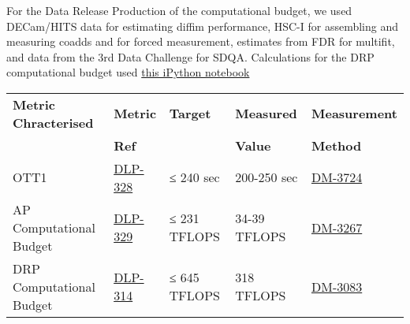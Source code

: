 \documentclass[DM,toc,lsstdraft]{lsstdoc}
\begin{document}
For the Data Release Production of the computational budget, we used
DECam/HITS data for estimating diffim performance, HSC-I for assembling
and measuring coadds and for forced measurement, estimates from FDR for
multifit, and data from the 3rd Data Challenge for SDQA. Calculations
for the DRP computational budget used
\href{https://github.com/lsst-dm/kpm/blob/29c053f7b832e8bd999527e012681826fc0c201c/DLP-314:\%20DRP\%20Computational\%20Budget/LSST\%20DRP\%20Computational\%20Budget.ipynb}{this
iPython notebook}

\begin{small}
\begin{longtable}[]{@{}lllll@{}}
\toprule
\textbf{Metric Chracterised} & \textbf{Metric} & \textbf{Target} &
\textbf{Measured} & \textbf{Measurement}\tabularnewline
 & \textbf{Ref} &  &
\textbf{Value} & \textbf{Method}\tabularnewline
\midrule
\endhead
OTT1 & \href{https://jira.lsstcorp.org/browse/DLP-328}{DLP-328} & ≤ 240
sec & 200-250 sec &
\href{https://jira.lsstcorp.org/browse/DM-3724}{DM-3724}\tabularnewline
AP Computational Budget &
\href{https://jira.lsstcorp.org/browse/DLP-329}{DLP-329} & ≤ 231 TFLOPS
& 34-39 TFLOPS &
\href{https://jira.lsstcorp.org/browse/DM-3267}{DM-3267}\tabularnewline
DRP Computational Budget &
\href{https://jira.lsstcorp.org/browse/DLP-314}{DLP-314} & ≤ 645 TFLOPS
& 318 TFLOPS &
\href{https://jira.lsstcorp.org/browse/DM-3083}{DM-3083}\tabularnewline
\bottomrule
\end{longtable}
\end{small}


\end{document}
